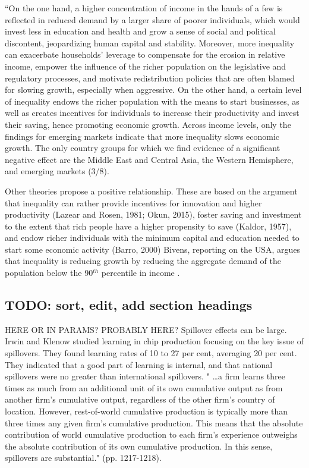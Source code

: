  ``On the one hand, a higher concentration of income in the hands of a few is reflected in reduced demand by a larger share of poorer individuals, which would invest less in education and health and grow a sense of social and political discontent, jeopardizing human capital and stability. Moreover, more inequality can exacerbate households' leverage to compensate for the erosion in relative income, empower the influence of the richer population on the legislative and regulatory processes, and motivate redistribution policies that are often blamed for slowing growth, especially when aggressive. On the other hand, a certain level of inequality endows the richer population with the means to start businesses, as well as creates incentives for individuals to increase their productivity and invest their saving, hence promoting economic growth. Across income levels, only the findings for emerging markets indicate that more inequality slows economic growth. The only country groups for which we find evidence of a significant negative effect are the Middle East and Central Asia, the Western Hemisphere, and emerging markets (3/8).

 
 Other theories propose a positive relationship. These are based on the argument that inequality can rather provide incentives for innovation and higher productivity (Lazear and Rosen, 1981; Okun, 2015), foster saving and investment to the extent that rich people have a higher propensity to save (Kaldor, 1957), and endow richer individuals with the minimum capital and education needed to start some economic activity (Barro, 2000)
Bivens, reporting on the USA, argues that inequality is reducing growth by reducing the aggregate demand of the population below the 90$^{th}$ percentile in income \cite{bivensInequalitySlowingUS2017}.



\subsection{TODO: sort, edit, add section headings} %

HERE OR IN PARAMS? PROBABLY HERE? Spillover effects can be large. Irwin and Klenow  studied learning in chip production focusing  on the key issue of spillovers. They found learning rates of 10 to 27 per cent, averaging 20 per cent. They indicated that a good part of learning is internal, and that national spillovers were no greater than international spillovers. " \dots a firm learns three times as much from an additional unit of its own cumulative output as from another firm's cumulative output, regardless of the other firm's country of location. However, rest-of-world cumulative production is typically more than three times any given firm's cumulative production. This means that the absolute contribution of world cumulative production to each firm's experience outweighs the absolute contribution of its own cumulative production. In this sense, spillovers are substantial." (pp. 1217-1218).


